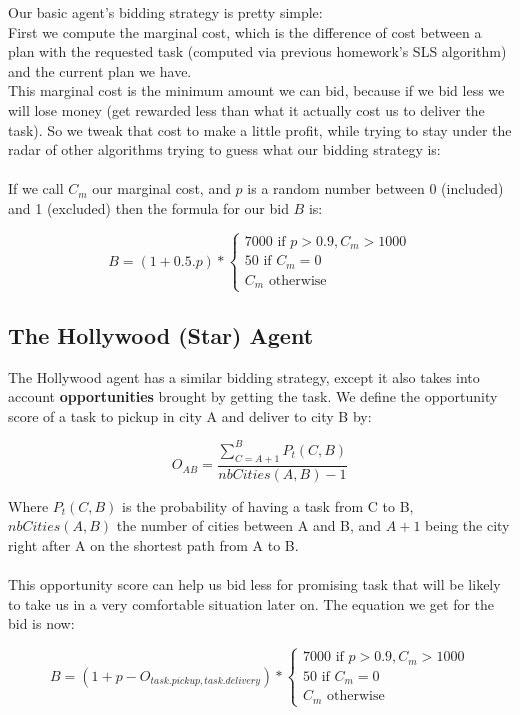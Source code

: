 \documentclass[fontsize=12pt]{scrartcl} %
\begin{document}
Our basic agent's bidding strategy is pretty simple:\\
First we compute the marginal cost, which is the difference of cost between a plan with the requested task (computed via previous homework's SLS algorithm) and the current plan we have.\\
This marginal cost is the minimum amount we can bid, because if we bid less we will lose money (get rewarded less than what it actually cost us to deliver the task). So we tweak that cost to make a little profit, while trying to stay under the radar of other algorithms trying to guess what our bidding strategy is:\\\\
If we call $C_m$ our marginal cost, and $p$ is a random number between 0 (included) and 1 (excluded) then the formula for our bid $B$ is:

\begin{equation}
B = (1 + 0.5.p) *
\begin{cases}
7000 \text{ if } p > 0.9 , C_m > 1000 \\
50 \text{ if } C_m = 0 \\
C_m \text{ otherwise }
\end{cases}
\end{equation}

\subsection*{The Hollywood (Star) Agent}

The Hollywood agent has a similar bidding strategy, except it also takes into account \textbf{opportunities} brought by getting the task. We define the opportunity score of a task to pickup in city A and deliver to city B by:

\begin{equation}
O_{AB} = \frac{\sum_{C= A+1}^{B} P_t(C, B)}{nbCities(A,B) - 1} 
\end{equation}

Where $P_t(C, B)$ is the probability of having a task from C to B, $nbCities(A,B)$ the number of cities between A and B, and $A+1$ being the city right after A on the shortest path from A to B.\\
\\
This opportunity score can help us bid less for promising task that will be likely to take us in a very comfortable situation later on. The equation we get for the bid is now: 

\begin{equation}
B = (1 + p - O_{task.pickup, task.delivery}) *
\begin{cases}
7000 \text{ if } p > 0.9 , C_m > 1000 \\
50 \text{ if } C_m = 0 \\
C_m \text{ otherwise }
\end{cases}
\end{equation}
\end{document}
